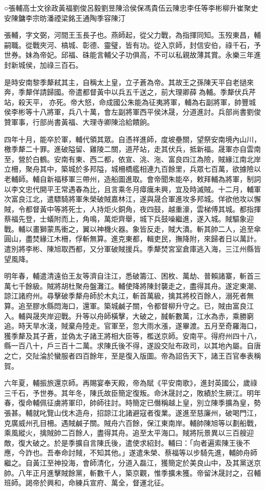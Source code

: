 
\begin{pinyinscope}
○張輔高士文徐政黃福劉俊呂毅劉昱陳洽侯保馮貴伍云陳忠李任等李彬柳升崔聚史安陳鏞李宗昉潘禋梁銘王通陶季容陳汀

張輔，字文弼，河間王玉長子也。燕師起，從父力戰，為指揮同知。玉歿東昌，輔嗣職。從戰夾河、槁城、彰德、靈璧，皆有功。從入京師，封信安伯，祿千石，予世券。妹為帝妃。邱福、硃能言輔父子功俱高，不可以私親故薄其賞。永樂三年進封新城侯，加祿三百石。

是時安南黎季犛弒其主，自稱太上皇，立子蒼為帝。其故王之孫陳天平自老撾來奔，季犛佯請歸國。帝遣都督黃中以兵五千送之，前大理卿薛為輔。季犛伏兵芹站，殺天平，亦死。帝大怒，命成國公朱能為征夷將軍，輔為右副將軍，帥豐城侯李彬等十八將軍，兵八十萬，會左副將軍西平侯沐晟，分道進討。兵部尚書劉俊贊軍事，行部尚書黃福、大理寺卿陳洽給饋餉。

四年十月，能卒於軍，輔代領其眾。自憑祥進師，度坡壘關，望祭安南境內山川，檄季犛二十罪。進破隘留、雞陵二關，道芹站，走其伏兵，抵新福。晟軍亦自雲南至，營於白鶴。安南有東、西二都，依宣、洮、沲、富良四江為險，賊緣江南北岸立柵，聚舟其中，築城於多邦隘，城柵橋艦相連九百餘里，兵眾七百萬，欲據險以老輔師。輔自新福移軍三帶州，造船圖進取。會帝聞朱能卒，敕拜輔為將軍，制詞以李文忠代開平王常遇春為比，且言乘冬月瘴癘未興，宜及時滅賊。十二月，輔軍次富良江北，遣驃騎將軍朱榮破賊嘉林江，遂與晟合軍進攻多邦城。佯欲他攻以懈賊，令都督黃中等將死士，人持炬火銅角，夜四鼓，越重濠，雲梯傅其城。都指揮蔡福先登，士蟻附而上，角鳴，萬炬齊舉，城下兵鼓噪繼進，遂入城。賊驅象迎戰。輔以畫獅蒙馬衝之，翼以神機火器。象皆反走，賊大潰。斬其帥二人，追至傘圓山，盡焚緣江木柵，俘斬無算。進克東都，輯吏民，撫降附，來歸者日以萬計。遣別將李彬、陳旭取西都，又分軍破賊援兵。季犛焚宮室倉庫逃入海，三江州縣皆望風降。

明年春，輔遣清遠伯王友等濟自注江，悉破籌江、困枚、萬劫、普賴諸寨，斬首三萬七千餘級。賊將胡杜聚舟盤灘江。輔使降將陳封襲走之，盡得其舟。遂定東潮、諒江諸府州。尋擊破季犛舟師於木丸江，斬首萬級，擒其將校百餘人，溺死者無算。追至膠水縣悶海口，還軍。築城鹹子關，令都督柳升守之。已，賊由富良江入。輔與晟夾岸迎戰。升等以舟師橫擊，大破之，馘斬數萬，江水為赤，乘勝窮追。時天旱水淺，賊棄舟陸走。官軍至，忽大雨水漲，遂畢渡。五月至奇羅海口，獲季犛及其子蒼，並偽太子諸王將相大臣等，檻送京師。安南平。得府州四十八，縣一百八十，戶三百十二萬。求陳氏後不得，遂設交阯布政司，以其地內屬。自唐之亡，交阯淪於蠻服者四百餘年，至是復入版圖。帝為詔告天下，諸王百官奉表稱賀。

六年夏，輔振旅還京師。再賜宴奉天殿，帝為賦《平安南歌》，進封英國公，歲祿三千石，予世券。其年冬，陳氏故臣簡定復叛。命沐晟討之，敗績於生厥江。明年春，復命輔佩征虜將軍印，帥師往討。時簡定已僭稱越上皇，別立陳季擴為皇，勢張甚。輔就叱覽山伐木造舟，招諒江北諸避寇者復業。遂進至慈廉州，破喝門江，克廣威州孔目柵。遇賊鹹子關。賊舟六百餘，保江東南岸。輔帥陳旭等以劃船戰，乘風縱火，擒賊帥二百餘人，盡得其舟。追至太平海口。賊將阮景異以三百艘迎敵，復大破之。於是季擴自言陳氏後，遣使求紹封。輔曰：「向者遍索陳王後不應，今詐也。吾奉命討賊，不知其他。」遂遣朱榮、蔡福等以步騎先進，輔帥舟師繼之。自黃江至神投海，會師清化，分道入磊江，獲簡定於美良山中，及其黨送京帥。八年正月進擊賊餘黨，斬數千人，築京觀，惟季擴未獲。帝留沐晟討之，召輔班師。謁帝於興和，命練兵宣府、萬全，督運北征。


\end{pinyinscope}
